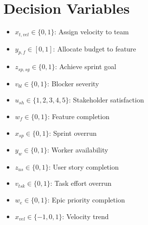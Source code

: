 \documentclass{article}
\begin{document}
\section{Decision Variables}
\begin{itemize}
    \item $x_{t,vel} \in \{0,1\}$: Assign velocity to team
    \item $y_{p,f} \in [0,1]$: Allocate budget to feature
    \item $z_{sp,sg} \in \{0,1\}$: Achieve sprint goal
    \item $v_{bl} \in \{0,1\}$: Blocker severity
    \item $u_{sh} \in \{1,2,3,4,5\}$: Stakeholder satisfaction
    \item $w_{f} \in \{0,1\}$: Feature completion
    \item $x_{sp} \in \{0,1\}$: Sprint overrun
    \item $y_{w} \in \{0,1\}$: Worker availability
    \item $z_{us} \in \{0,1\}$: User story completion
    \item $v_{tsk} \in \{0,1\}$: Task effort overrun
    \item $w_{e} \in \{0,1\}$: Epic priority completion
    \item $x_{vel} \in \{-1,0,1\}$: Velocity trend
\end{itemize}
\end{document}
